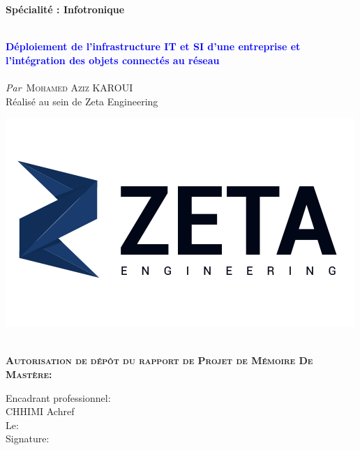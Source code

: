 \begin{titlepage}

\textbf{Spécialité : Infotronique}

\vskip1cm%


\HRule \\[0.4cm]
\textcolor{blue}{ \LARGE \bfseries Déploiement de l'infrastructure IT et SI d'une entreprise et l'intégration des objets connectés au réseau}\\[0.4cm] %
\HRule \\[1cm]


\textit{Par}\
\textsc{\large Mohamed Aziz KAROUI}\\[0.5cm] %


{Réalisé au sein de Zeta Engineering}\\
\smallskip

\includegraphics[width=0.4\columnwidth]{Images/logo-zeta.png}\

 

\begin{flushleft}
\textbf{\textsc{Autorisation de dépôt du rapport de Projet de Mémoire De Mastère:}}\\[0.5cm] %
\vskip0.5cm
\begin{minipage}[c]{0.4\columnwidth}
Encadrant professionnel: \\ CHHIMI Achref \\

Le:\\

Signature:\\


\end{minipage}
\end{flushleft}
\end{titlepage}
